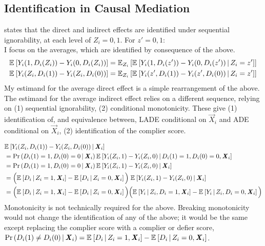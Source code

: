 \subsection{Identification in Causal Mediation}
\label{appendix:identification}
\citet[Theorem~1]{imai2010identification} states that the direct and indirect effects are identified under sequential ignorability, at each level of $Z_i = 0,1$.
For $z' = 0,1$: \\
I focus on the averages, which are identified by consequence of the above.
\begin{align*}
    \E{ Y_i(1, D_i(Z_i)) - Y_i(0, D_i(Z_i))}
    &= \E[Z_i]{\Egiven{ Y_i(1, D_i(z')) - Y_i(0, D_i(z'))}{Z_i = z'}} \\
    \E{ Y_i(Z_i, D_i(1)) - Y_i(Z_i, D_i(0))}
    & = \E[Z_i]{\Egiven{ Y_i(z', D_i(1)) - Y_i(z', D_i(0))}{Z_i = z'}}
\end{align*}
My estimand for the average direct effect is a simple rearrangement of the above.
The estimand for the average indirect effect relies on a different sequence, relying on (1) sequential ignorability, (2) conditional monotonicity.
These give (1) identification of, and equivalence between, LADE conditional on $\vec X_i$ and ADE conditional on $\vec X_i$, (2) identification of the complier score.

\begin{align*}
    & \Egiven{ Y_i(Z_i, D_i(1)) - Y_i(Z_i, D_i(0))}{\vec X_i} \\
    & = \Probgiven{D_i(1) = 1, D_i(0) = 0}{\vec X_i}
        \Egiven{ Y_i(Z_i, 1) - Y_i(Z_i, 0)}{D_i(1) = 1, D_i(0) = 0, \vec X_i} \\
    & = \Probgiven{D_i(1) = 1, D_i(0) = 0}{\vec X_i}
        \Egiven{ Y_i(Z_i, 1) - Y_i(Z_i, 0)}{\vec X_i} \\
    & = \Big( \Egiven{D_i}{Z_i = 1, \vec X_i} - \Egiven{D_i}{Z_i = 0, \vec X_i}
        \Big) \; \Egiven{ Y_i(Z_i, 1) - Y_i(Z_i, 0)}{\vec X_i} \\
    & = \Big( \Egiven{D_i}{Z_i = 1, \vec X_i} - \Egiven{D_i}{Z_i = 0, \vec X_i}
        \Big)
        \Big( \Egiven{Y_i}{Z_i, D_i = 1, \vec X_i}
            - \Egiven{Y_i}{Z_i, D_i = 0, \vec X_i} \Big)
\end{align*}
Monotonicity is not technically required for the above.
Breaking monotonicity would not change the identification of any of the above; it would be the same except replacing the complier score with a complier or defier score, $\Probgiven{D_i(1) \neq D_i(0)}{\vec X_i} = \Egiven{D_i}{Z_i = 1, \vec X_i} - \Egiven{D_i}{Z_i = 0, \vec X_i}$.

